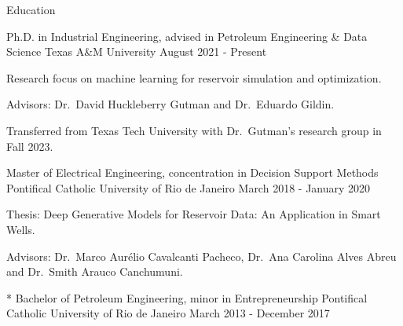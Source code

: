 \begin{cvcontentsection}{Education}

\begin{cvjob}
    {Ph.D. in Industrial Engineering, advised in Petroleum Engineering \& Data Science}
    {Texas A\&M University}
    {}
    {August 2021 - Present}
    \item Research focus on machine learning for reservoir simulation and optimization.
    \item Advisors: Dr.\ David Huckleberry Gutman and Dr.\ Eduardo Gildin.
    \item Transferred from Texas Tech University with Dr.\ Gutman's research group in Fall 2023.
\end{cvjob}

\begin{cvjob}
    {Master of Electrical Engineering, concentration in Decision Support Methods}
    {Pontifical Catholic University of Rio de Janeiro}
    {}
    {March 2018 - January 2020}
    \item Thesis: Deep Generative Models for Reservoir Data: An Application in Smart Wells.
    \item Advisors: Dr.\ Marco Aurélio Cavalcanti Pacheco, Dr.\ Ana Carolina Alves Abreu and Dr.\ Smith Arauco Canchumuni.
\end{cvjob}

\begin{cvjob}*
    {Bachelor of Petroleum Engineering, minor in Entrepreneurship}
    {Pontifical Catholic University of Rio de Janeiro}
    {}
    {March 2013 - December 2017}
\end{cvjob}

\end{cvcontentsection}
